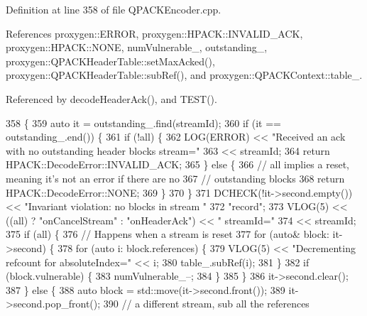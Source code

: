 Definition at line 358 of file Q\+P\+A\+C\+K\+Encoder.\+cpp.



References proxygen\+::\+E\+R\+R\+OR, proxygen\+::\+H\+P\+A\+C\+K\+::\+I\+N\+V\+A\+L\+I\+D\+\_\+\+A\+CK, proxygen\+::\+H\+P\+A\+C\+K\+::\+N\+O\+NE, num\+Vulnerable\+\_\+, outstanding\+\_\+, proxygen\+::\+Q\+P\+A\+C\+K\+Header\+Table\+::set\+Max\+Acked(), proxygen\+::\+Q\+P\+A\+C\+K\+Header\+Table\+::sub\+Ref(), and proxygen\+::\+Q\+P\+A\+C\+K\+Context\+::table\+\_\+.



Referenced by decode\+Header\+Ack(), and T\+E\+S\+T().


\begin{DoxyCode}
358                                                                       \{
359   \textcolor{keyword}{auto} it = outstanding_.find(streamId);
360   \textcolor{keywordflow}{if} (it == outstanding_.end()) \{
361     \textcolor{keywordflow}{if} (!all) \{
362       LOG(ERROR) << \textcolor{stringliteral}{"Received an ack with no outstanding header blocks stream="}
363                  << streamId;
364       \textcolor{keywordflow}{return} HPACK::DecodeError::INVALID_ACK;
365     \} \textcolor{keywordflow}{else} \{
366       \textcolor{comment}{// all implies a reset, meaning it's not an error if there are no}
367       \textcolor{comment}{// outstanding blocks}
368       \textcolor{keywordflow}{return} HPACK::DecodeError::NONE;
369     \}
370   \}
371   DCHECK(!it->second.empty()) << \textcolor{stringliteral}{"Invariant violation: no blocks in stream "}
372      \textcolor{stringliteral}{"record"};
373   VLOG(5) << ((all) ? \textcolor{stringliteral}{"onCancelStream"} : \textcolor{stringliteral}{"onHeaderAck"}) << \textcolor{stringliteral}{" streamId="}
374           << streamId;
375   \textcolor{keywordflow}{if} (all) \{
376     \textcolor{comment}{// Happens when a stream is reset}
377     \textcolor{keywordflow}{for} (\textcolor{keyword}{auto}& block: it->second) \{
378       \textcolor{keywordflow}{for} (\textcolor{keyword}{auto} i: block.references) \{
379         VLOG(5) << \textcolor{stringliteral}{"Decrementing refcount for absoluteIndex="} << i;
380         table_.subRef(i);
381       \}
382       \textcolor{keywordflow}{if} (block.vulnerable) \{
383         numVulnerable_--;
384       \}
385     \}
386     it->second.clear();
387   \} \textcolor{keywordflow}{else} \{
388     \textcolor{keyword}{auto} block = std::move(it->second.front());
389     it->second.pop\_front();
390     \textcolor{comment}{// a different stream, sub all the references}

\end{DoxyCode}

